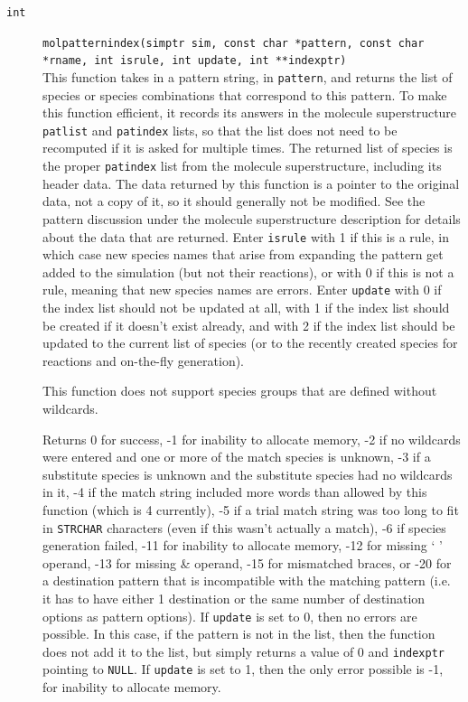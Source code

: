 \documentclass {scrbook}
\newcommand {\ttt} {\texttt}
\begin{document}
\begin{description}
\item[\ttt{int}]
\ttt{molpatternindex(simptr sim, const char *pattern, const char *rname, int isrule, int update, int **indexptr)} \\
This function takes in a pattern string, in \ttt{pattern}, and returns the list of species or species combinations that correspond to this pattern. To make this function efficient, it records its answers in the molecule superstructure \ttt{patlist} and \ttt{patindex} lists, so that the list does not need to be recomputed if it is asked for multiple times. The returned list of species is the proper \ttt{patindex} list from the molecule superstructure, including its header data. The data returned by this function is a pointer to the original data, not a copy of it, so it should generally not be modified. See the pattern discussion under the molecule superstructure description for details about the data that are returned. Enter \ttt{isrule} with 1 if this is a rule, in which case new species names that arise from expanding the pattern get added to the simulation (but not their reactions), or with 0 if this is not a rule, meaning that new species names are errors. Enter \ttt{update} with 0 if the index list should not be updated at all, with 1 if the index list should be created if it doesn't exist already, and with 2 if the index list should be updated to the current list of species (or to the recently created species for reactions and on-the-fly generation).

This function does not support species groups that are defined without wildcards.

Returns 0 for success, -1 for inability to allocate memory, -2 if no wildcards were entered and one or more of the match species is unknown, -3 if a substitute species is unknown and the substitute species had no wildcards in it, -4 if the match string included more words than allowed by this function (which is 4 currently), -5 if a trial match string was too long to fit in \ttt{STRCHAR} characters (even if this wasn't actually a match), -6 if species generation failed, -11 for inability to allocate memory, -12 for missing ` ' operand, -13 for missing \& operand, -15 for mismatched braces, or -20 for a destination pattern that is incompatible with the matching pattern (i.e. it has to have either 1 destination or the same number of destination options as pattern options). If \ttt{update} is set to 0, then no errors are possible. In this case, if the pattern is not in the list, then the function does not add it to the list, but simply returns a value of 0 and \ttt{indexptr} pointing to \ttt{NULL}. If \ttt{update} is set to 1, then the only error possible is -1, for inability to allocate memory.


\end{description}
\end{document}

